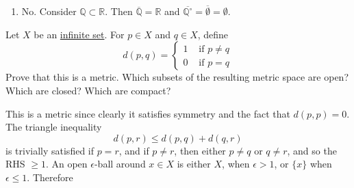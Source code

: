 \begin{solution}
\begin{enumerate}
        \item No. Consider $\mathbb{Q} \subset \mathbb{R}$. Then $\overline{\mathbb{Q}} = \mathbb{R}$ and $\overline{\mathbb{Q}^\circ} = \overline{\emptyset} = \emptyset$.  
    \end{enumerate}
  \end{solution}

  \begin{exercise}[Rudin 2.10]
    Let $X$ be an \hyperref[st-def:infinite-set]{infinite set}. For $p \in X$ and $q \in X$, define 
    \begin{equation}
      d(p, q) = \begin{cases} 1 & \text{ if } p \neq q \\ 0 & \text{ if } p = q \end{cases}
    \end{equation}
    Prove that this is a metric. Which subsets of the resulting metric space are open? Which are closed? Which are compact? 
  \end{exercise}
  \begin{solution}
    This is a metric since clearly it satisfies symmetry and the fact that $d(p, p) = 0$. The triangle inequality 
    \begin{equation}
      d(p, r) \leq d(p, q) + d(q, r)
    \end{equation}
    is trivially satisfied if $p = r$, and if $p \neq r$, then either $p \neq q$ or $q \neq r$, and so the RHS $\geq 1$. An open $\epsilon$-ball around $x \in X$ is either $X$, when $\epsilon > 1$, or $\{x\}$ when $\epsilon \leq 1$. Therefore 
  \end{solution}


